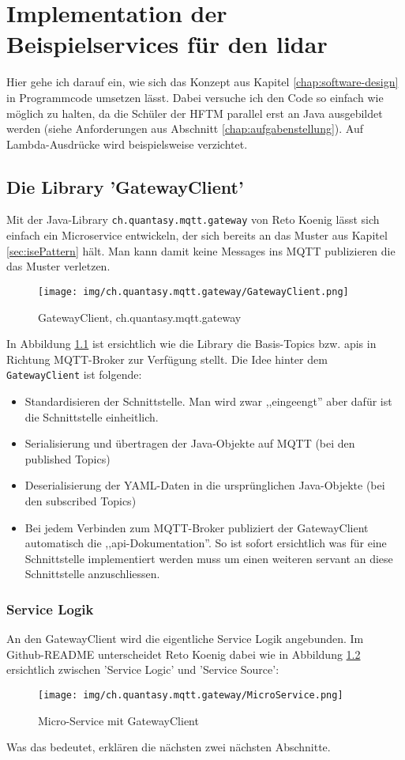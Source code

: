 \chapter{Implementation der Beispielservices für den \acrshort{lidar}}
Hier gehe ich darauf ein, wie sich das Konzept aus Kapitel \ref{chap:software-design} in Programmcode umsetzen lässt. Dabei versuche ich den Code so einfach wie möglich zu halten, da die Schüler der HFTM parallel erst an Java ausgebildet werden (siehe Anforderungen aus Abschnitt \ref{chap:aufgabenstellung}). Auf Lambda-Ausdrücke wird beispielsweise verzichtet.
\label{chap:beispielimplementation}
\section{Die Library 'GatewayClient'}
Mit der  Java-Library \verb|ch.quantasy.mqtt.gateway| von Reto Koenig\cite{ch.quantasy.mqtt.gateway} lässt sich einfach ein Microservice entwickeln, der sich bereits an das Muster aus Kapitel \ref{sec:isePattern} hält. Man kann damit keine Messages ins MQTT publizieren die das Muster verletzen. 
\begin{figure}[H]
	\centering
	\texttt{[image: img/ch.quantasy.mqtt.gateway/GatewayClient.png]}
	\caption{GatewayClient, ch.quantasy.mqtt.gateway\cite{ch.quantasy.mqtt.gateway}}
	\label{fig:gatewayclient}
\end{figure}
In Abbildung \ref{fig:gatewayclient} ist ersichtlich wie die Library die Basis-Topics bzw. \acrshort{api}s in Richtung MQTT-Broker zur Verfügung stellt. Die Idee hinter dem \verb|GatewayClient| ist folgende:
\begin{itemize}
	\item
	Standardisieren der Schnittstelle. Man wird zwar ,,eingeengt'' aber dafür ist die Schnittstelle einheitlich.
	\item
	Serialisierung und übertragen der Java-Objekte auf MQTT (bei den published Topics)
	\item
	Deserialisierung der YAML-Daten in die ursprünglichen Java-Objekte (bei den subscribed Topics)
	\item
	Bei jedem Verbinden zum MQTT-Broker publiziert der GatewayClient automatisch die ,,\acrshort{api}-Dokumentation''. So ist sofort ersichtlich was für eine Schnittstelle implementiert werden muss um einen weiteren \Gls{servant} an diese Schnittstelle anzuschliessen.
\end{itemize}
\subsection{Service Logik}
An den GatewayClient wird die eigentliche Service Logik angebunden. Im Github-README unterscheidet Reto Koenig\cite{ch.quantasy.mqtt.gateway} dabei wie in Abbildung \ref{fig:microService} ersichtlich zwischen 'Service Logic' und 'Service Source':
\begin{figure}[H]
	\centering
	\texttt{[image: img/ch.quantasy.mqtt.gateway/MicroService.png]}
	\caption{Micro-Service mit GatewayClient \cite{ch.quantasy.mqtt.gateway}}
	\label{fig:microService}
\end{figure}
Was das bedeutet, erklären die nächsten zwei nächsten Abschnitte.
